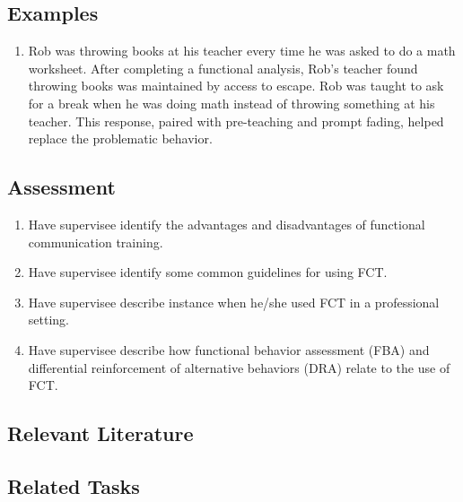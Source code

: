 \subsection{Examples}
\begin{enumerate}
\item Rob was throwing books at his teacher every time he was asked to do a math worksheet. After completing a functional analysis, Rob's teacher found throwing books was maintained by access to escape. Rob was taught to ask for a break when he was doing math instead of throwing something at his teacher. This response, paired with pre-teaching and prompt fading, helped replace the problematic behavior.
\end{enumerate}
%
\subsection{Assessment}
\begin{enumerate}
\item Have supervisee identify the advantages and disadvantages of functional communication training.
\item Have supervisee identify some common guidelines for using FCT.
\item Have supervisee describe instance when he/she used FCT in a professional setting.
\item Have supervisee describe how functional behavior assessment (FBA) and differential reinforcement of alternative behaviors (DRA) relate to the use of FCT.
%
\end{enumerate}
%
\subsection{Relevant Literature}
\begin{refsection}
\nocite{cooper2007applied,
        durand1999functional,
        carr1985reducing,
        durand1992analysis,
        fisher1998establishing,
        hanley2001reinforcement}
\printbibliography[heading=none]
\end{refsection}
%
\subsection{Related Tasks}
\fourdTwo{}\\\
\fourdThree{}\\
\fourdFour{}\\
\fourdFive{}\\
\fourdTen{}\\
\fourdEleven{}\\
\fourdTwentyOne{}\\
\foureOne{}\\
\fouriThree{}\\
\fouriFour{}\\
